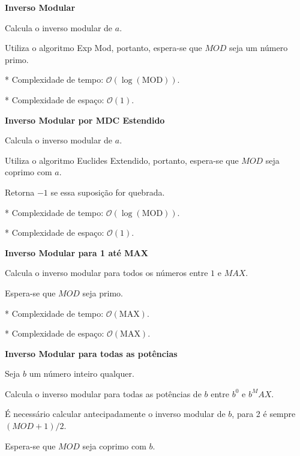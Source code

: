 \documentclass[10pt, a4paper, oneside]{book}
\begin{document}
\textbf{Inverso Modular} 



Calcula o inverso modular de $a$.



Utiliza o algoritmo Exp Mod, portanto, espera-se que $MOD$ seja um número primo.



* Complexidade de tempo: $\mathcal{O}(\log(\text{MOD}))$.

* Complexidade de espaço: $\mathcal{O}(1)$.



\textbf{Inverso Modular por MDC Estendido} 



Calcula o inverso modular de $a$.



Utiliza o algoritmo Euclides Extendido, portanto, espera-se que $MOD$ seja coprimo com $a$.



Retorna $-1$ se essa suposição for quebrada.



* Complexidade de tempo: $\mathcal{O}(\log(\text{MOD}))$.

* Complexidade de espaço: $\mathcal{O}(1)$.



\textbf{Inverso Modular para 1 até MAX} 



Calcula o inverso modular para todos os números entre $1$ e $MAX$.



Espera-se que $MOD$ seja primo.



* Complexidade de tempo: $\mathcal{O}(\text{MAX})$.

* Complexidade de espaço: $\mathcal{O}(\text{MAX})$.



\textbf{Inverso Modular para todas as potências} 



Seja $b$ um número inteiro qualquer.



Calcula o inverso modular para todas as potências de $b$ entre $b^0$ e $b^MAX$.



É necessário calcular antecipadamente o inverso modular de $b$, para 2 é sempre $(MOD+1)/2$.



Espera-se que $MOD$ seja coprimo com $b$.
\end{document}
